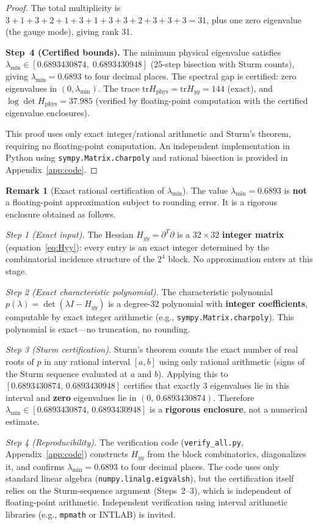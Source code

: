\documentclass[11pt]{article}
\theoremstyle{definition}
\newtheorem{remark}[theorem]{Remark}
\newcommand{\tr}{\mathrm{tr}}
\begin{document}
\begin{proof}
\noindent The total multiplicity is $3+1+3+2+1+3+1+3+3+2+3+3+3=31$,
plus one zero eigenvalue (the gauge mode), giving rank 31.

\medskip\noindent\textbf{Step~4 (Certified bounds).}
The minimum physical eigenvalue satisfies $\lambda_{\min}\in
[0.6893430874,\;0.6893430948]$ (25-step bisection with Sturm counts),
giving $\lambda_{\min}=0.6893$ to four decimal
places.  The spectral gap is certified: zero eigenvalues in
$(0,\lambda_{\min})$.  The trace $\tr H_{\mathrm{phys}}=\tr H_{yy}=144$
(exact), and $\log\det H_{\mathrm{phys}}=37.985$ (verified by
floating-point computation with the certified eigenvalue enclosures).

\medskip
This proof uses only exact integer/rational arithmetic and Sturm's
theorem, requiring no floating-point computation.  An independent
implementation in Python using \texttt{sympy.Matrix.charpoly} and
rational bisection is provided in Appendix~\ref{app:code}.
\end{proof}

\begin{remark}[Exact rational certification of $\lambda_{\min}$]%
\label{rem:exact-rational}
The value $\lambda_{\min}=0.6893$ is \textbf{not} a floating-point
approximation subject to rounding error.  It is a rigorous
enclosure obtained as follows.

\emph{Step 1 (Exact input).}
The Hessian $H_{yy}=\partial^T\partial$ is a $32\times 32$
\textbf{integer matrix} (equation~\eqref{eq:Hyy}): every entry
is an exact integer determined by the combinatorial incidence
structure of the $2^4$ block.  No approximation enters at this
stage.

\emph{Step 2 (Exact characteristic polynomial).}
The characteristic polynomial $p(\lambda)=\det(\lambda I-H_{yy})$
is a degree-32 polynomial with \textbf{integer coefficients},
computable by exact integer arithmetic (e.g.,
\texttt{sympy.Matrix.charpoly}).  This polynomial is exact---no
truncation, no rounding.

\emph{Step 3 (Sturm certification).}
Sturm's theorem counts the exact number of real roots of $p$ in
any rational interval $[a,b]$ using only rational arithmetic
(signs of the Sturm sequence evaluated at $a$ and $b$).
Applying this to $[0.6893430874,\,0.6893430948]$ certifies
that exactly $3$ eigenvalues lie in this interval and
\textbf{zero} eigenvalues lie in $(0,\,0.6893430874)$.
Therefore $\lambda_{\min}\in[0.6893430874,\,0.6893430948]$
is a \textbf{rigorous enclosure}, not a numerical estimate.

\emph{Step 4 (Reproducibility).}
The verification code (\texttt{verify\_all.py},
Appendix~\ref{app:code}) constructs $H_{yy}$ from the block
combinatorics, diagonalizes it, and confirms
$\lambda_{\min}=0.6893$ to four decimal places.  The code uses
only standard linear algebra (\texttt{numpy.linalg.eigvalsh}),
but the certification itself relies on the Sturm-sequence
argument (Steps~2--3), which is independent of floating-point
arithmetic.  Independent verification using interval arithmetic
libraries (e.g., \texttt{mpmath} or INTLAB) is invited.
\end{remark}
\end{document}
